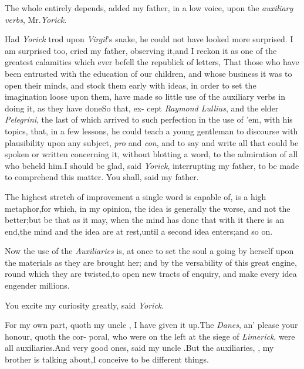 \documentclass[twoside]{article}
\begin{document}
\tsh The whole entirely depends, add\-ed my father, in a
low voice, upon the \textit{auxiliary verbs}, Mr.\@ \textit{Yorick}.

Had \textit{Yorick} trod upon \textit{Virgil}\kern 0.5pt’s snake,
he could not have looked more surprised.\break
\tsk I am surprised too, cried my father,\break
observing it,\tsk and I reckon it as one of the
greatest calamities which ever befell the republick of letters, That
those who have been entrusted with the education of our children,
and whose business it was to open their minds, and stock them early
with ideas, in order to set the ima\-gination loose upon them, have
made so little use of the auxiliary verbs in doing it, as they have
done\tsh So that, ex- cept \textit{Raymond Lullius}, and the
elder \textit{Pe\-legrini}, the last of which arrived to such
perfection in the use of ’em, with his to\-pics, that, in a few
lessons, he could teach a young gentleman to discourse with
plausibility upon any subject, \textit{pro} and \textit{con}, and to
say and write all that could be spoken or written concerning it,
without blotting a word, to the admiration of all who beheld
him.\tsk I should be glad, said \textit{Yorick}, interrupting my father,
to be made to comprehend this matter. You shall, said my
father.

The highest stretch of improvement a single word is capable of,
is a high metaphor,\tsh for which, in my opinion, the idea
is generally the worse, and not the better;\tsh but be
that as it may, 
\tsk when the mind has done that with it\break
\tsk there is an end,\tsk the mind and the\break
idea are at rest,\tsk until a second idea enters;\tsk and so on.

Now the use of the \textit{Auxiliaries} is, at once to set the
soul a going by herself upon the materials as they are brought her;
and by the versability of this great engine, round which they are
twisted,\break to open new tracts of enquiry, and make every idea
engender millions.

You excite my curiosity greatly, said \textit{Yorick}.

For my own part, quoth my uncle\break
\toby, I have given it up.\tsh The \textit{Danes},\break
an’ please your honour, quoth the cor-
poral, who were on the left at the siege of \textit{Limerick}, were all
auxiliaries.\tsh And very good ones, said my uncle
\toby.\tsk But the auxiliaries, \trim, my brother is
talking about,\tsk I conceive to be different
things.\tsh
\end{document}
